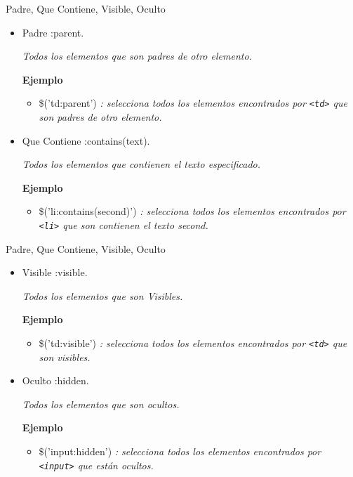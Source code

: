 \begin{frame}[fragile]{Padre,  Que Contiene, Visible, Oculto} %
\begin{itemize}
    \item Padre :parent.
    
    \textit{Todos los elementos que son padres de otro elemento.}
    
    \textbf{Ejemplo}
        \begin{itemize}
            \item \$('td:parent') \textit{: selecciona todos los elementos encontrados por \texttt{<td>} que son padres de otro elemento.}
        \end{itemize}

    \item Que Contiene :contains(text).
    
    \textit{Todos los elementos que contienen el texto especificado.}
    
    \textbf{Ejemplo}
        \begin{itemize}
            \item \$('li:contains(second)') \textit{: selecciona todos los
            elementos encontrados por \texttt{<li>} que son contienen el texto
            second.}
        \end{itemize}
\end{itemize}
\end{frame}

\begin{frame}[fragile]{Padre,  Que Contiene, Visible, Oculto} %
\begin{itemize}
    \item Visible :visible.
    
    \textit{Todos los elementos que son Visibles.}

    \textbf{Ejemplo}
        \begin{itemize}
            \item \$('td:visible') \textit{: selecciona todos los elementos
            encontrados por \texttt{<td>} que son visibles.}
        \end{itemize}

    \item Oculto :hidden.
    
    \textit{Todos los elementos que son ocultos.}
    
    \textbf{Ejemplo}
        \begin{itemize}
            \item \$('input:hidden') \textit{: selecciona todos los elementos
            encontrados por \texttt{<input>} que están ocultos.}
        \end{itemize}
\end{itemize}
\end{frame}

